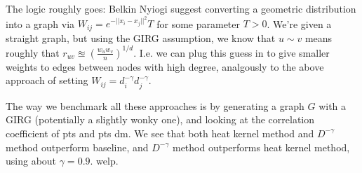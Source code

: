 The logic roughly goes: Belkin Nyiogi suggest converting a geometric distribution into a graph via $W_{ij} = e^{-||x_i - x_j||^2}{T}$ for some parameter $T > 0$. We're given a straight graph, but using the GIRG assumption, we know that $u \sim v$ means roughly that $r_{uv} \approxeq \left ( \frac{w_u w_v}{n} \right )^{1/d}$. I.e. we can plug this guess in to give smaller weights to edges between nodes with high degree, analgously to the above approach of setting $W_{ij} = d_i^{-\gamma} d_j^{-\gamma}$.

The way we benchmark all these approaches is by generating a graph $G$ with a GIRG (potentially a slightly wonky one), and looking at the correlation coefficient of pts and pts dm. We see that both heat kernel method and $D^{-\gamma}$ method outperform baseline, and $D^{-\gamma}$ method outperforms heat kernel method, using about $\gamma=0.9$. welp.










